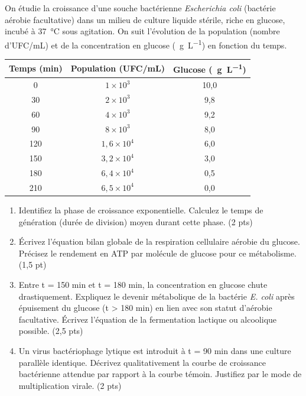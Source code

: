 \documentclass[11pt]{article}
\begin{document}
\begin{exercice}
On étudie la croissance d'une souche bactérienne \textit{Escherichia coli} (bactérie aérobie facultative) dans un milieu de culture liquide stérile, riche en glucose, incubé à \SI{37}{\celsius} sous agitation. On suit l'évolution de la population (nombre d'UFC/mL) et de la concentration en glucose (\SI{}{\gram\per\liter}) en fonction du temps.

\begin{center}
\begin{tabular}{|c|c|c|}
\hline
\textbf{Temps (min)} & \textbf{Population (UFC/mL)} & \textbf{Glucose (\SI{}{\gram\per\liter})} \\
\hline
0 & $1 \times 10^3$ & 10,0 \\
30 & $2 \times 10^3$ & 9,8 \\
60 & $4 \times 10^3$ & 9,2 \\
90 & $8 \times 10^3$ & 8,0 \\
120 & $1,6 \times 10^4$ & 6,0 \\
150 & $3,2 \times 10^4$ & 3,0 \\
180 & $6,4 \times 10^4$ & 0,5 \\
210 & $6,5 \times 10^4$ & 0,0 \\
\hline
\end{tabular}
\end{center}
\begin{enumerate}
    \item Identifiez la phase de croissance exponentielle. Calculez le temps de génération (durée de division) moyen durant cette phase. (2 pts)
    \item Écrivez l'équation bilan globale de la respiration cellulaire aérobie du glucose. Précisez le rendement en ATP par molécule de glucose pour ce métabolisme. (1,5 pt)
    \item Entre t = 150 min et t = 180 min, la concentration en glucose chute drastiquement. Expliquez le devenir métabolique de la bactérie \textit{E. coli} après épuisement du glucose (t > 180 min) en lien avec son statut d'aérobie facultative. Écrivez l'équation de la fermentation lactique ou alcoolique possible. (2,5 pts)
    \item Un virus bactériophage lytique est introduit à t = 90 min dans une culture parallèle identique. Décrivez qualitativement la courbe de croissance bactérienne attendue par rapport à la courbe témoin. Justifiez par le mode de multiplication virale. (2 pts)
\end{enumerate}
\end{exercice}
\end{document}
